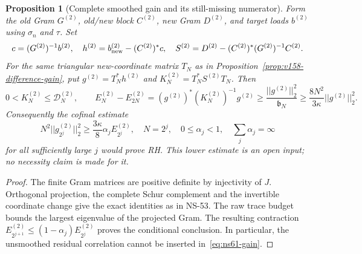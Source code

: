 \documentclass[11pt]{article}
\def\norm#1{||#1||}%
\newtheorem{proposition}[theorem]{Proposition}
\theoremstyle{remark}
\newcommand{\norm}[1]{\left\lVert #1\right\rVert}
\begin{document}
\begin{proposition}[Complete smoothed gain and its still-missing numerator]
\label{prop:ns61-gain}
Form the old Gram $G^{(2)}$, old/new block $C^{(2)}$, new Gram
$D^{(2)}$, and target loads $b^{(2)}$ using $\sigma_n$ and $\tau$.
Set
\[
 c=(G^{(2)})^{-1}b^{(2)},\quad
 h^{(2)}=b_{\rm new}^{(2)}-(C^{(2)})^*c,\quad
 S^{(2)}=D^{(2)}-(C^{(2)})^*(G^{(2)})^{-1}C^{(2)}.
\]
For the same triangular new-coordinate matrix $T_N$ as in
Proposition~\ref{prop:v158-difference-gain}, put
$g^{(2)}=T_N^*h^{(2)}$ and $K_N^{(2)}=T_N^*S^{(2)}T_N$.
Then
\begin{equation}
 0<K_N^{(2)}\leq\mathcal D_N^{(2)},\qquad
 E_N^{(2)}-E_{2N}^{(2)}
 =(g^{(2)})^*(K_N^{(2)})^{-1}g^{(2)}
 \geq\frac{\norm{g^{(2)}}_2^2}{\mathfrak b_N}
 \geq\frac{8N^2}{3\kappa}\norm{g^{(2)}}_2^2.
 \label{eq:ns61-gain}
\end{equation}
Consequently the cofinal estimate
\begin{equation}
 N^2\norm{g_{2^j}^{(2)}}_2^2
 \geq\frac{3\kappa}{8}\alpha_j E_{2^j}^{(2)},
 \quad N=2^j,\quad 0\leq\alpha_j<1,\quad
 \sum_j\alpha_j=\infty
 \label{eq:ns61-open-correlation}
\end{equation}
for all sufficiently large $j$ would prove RH. This lower estimate
is an open input; no necessity claim is made for it.
\end{proposition}
\begin{proof}
The finite Gram matrices are positive definite by injectivity of $J$.
Orthogonal projection, the complete Schur complement and the invertible
coordinate change give the exact identities as in NS-53.
The raw trace budget bounds the largest eigenvalue of the projected
Gram. The resulting contraction
$E_{2^{j+1}}^{(2)}\leq(1-\alpha_j)E_{2^j}^{(2)}$ proves the
conditional conclusion. In particular, the unsmoothed residual
correlation cannot be inserted in~\eqref{eq:ns61-gain}.
\end{proof}
\end{document}
